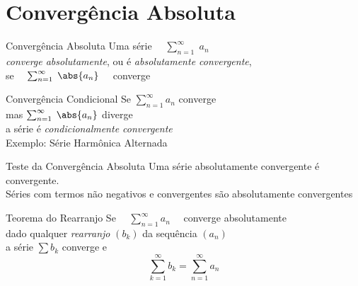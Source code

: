 \section{Convergência Absoluta}

\begin{frame}{Convergência Absoluta}
  Uma série
  \(\quad \sum_{n=1}^{\infty}\; a_n\) \\[5mm]
  \emph{converge absolutamente}, ou é \emph{absolutamente convergente}, \\[5mm]
  se
  \(\quad\sum_{n=1}^{\infty} \;\abs{a_n} \quad\) converge
\end{frame}

\begin{frame}{Convergência Condicional}
  Se  \tabto{12mm} \(\sum_{n=1}^{\infty} a_n\)          \tabto{32mm} converge \\[9mm]
  mas \tabto{12mm} \(\sum_{n=1}^{\infty} \;\abs{a_n} \) \tabto{32mm} diverge  \\[9mm]
  a série é \emph{condicionalmente convergente} \\[9mm]
  \pause
  Exemplo: Série Harmônica Alternada
\end{frame}

\begin{frame}{Teste da Convergência Absoluta}
  Uma série absolutamente convergente é convergente.\\[3mm]

  \pause
  \vspace{\baselineskip}
  Séries com termos não negativos e convergentes
  são absolutamente convergentes
\end{frame}

\begin{frame}{Teorema do Rearranjo}
Se \(\quad\sum_{n=1}^{\infty} a_n \quad \) converge absolutamente \\[5mm]

\pause
dado qualquer \emph{rearranjo} $(b_k)$ da sequência $(a_n)$ \\[5mm]

\pause
a série $\sum b_k$ converge e
\[
  \sum_{k=1}^{\infty} b_k = \sum_{n=1}^{\infty} a_n
\]
\end{frame}

